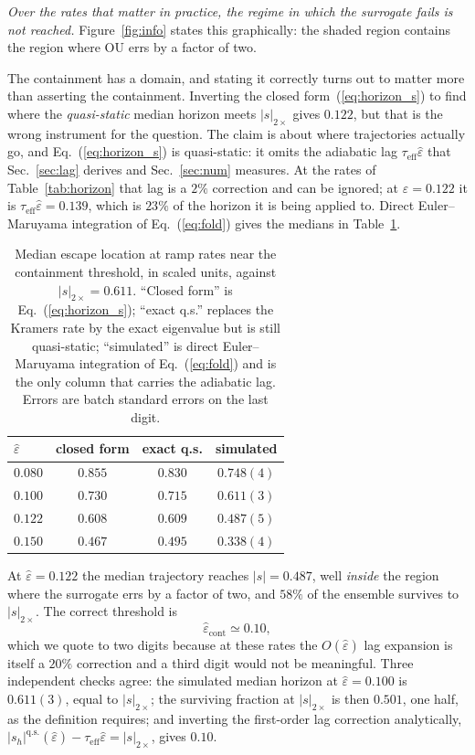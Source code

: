 \documentclass[%
 twocolumn,
 superscriptaddress,
 amsmath,amssymb,
 aps,
 pre,
 floatfix,
]{revtex4-2}
\newcommand{\Sig}{\hat\varepsilon}
\begin{document}
\emph{Over the rates that matter in practice, the regime in which the surrogate fails is not reached.}  Figure~\ref{fig:info} states this graphically: the shaded region contains the region where OU errs by a factor of two.

The containment has a domain, and stating it correctly turns out to matter more than asserting the containment.  Inverting the closed form~(\ref{eq:horizon_s}) to find where the \emph{quasi-static} median horizon meets $|s|_{2\times}$ gives $0.122$, but that is the wrong instrument for the question.  The claim is about where trajectories actually go, and Eq.~(\ref{eq:horizon_s}) is quasi-static: it omits the adiabatic lag $\tau_{\mathrm{eff}}\Sig$ that Sec.~\ref{sec:lag} derives and Sec.~\ref{sec:num} measures.  At the rates of Table~\ref{tab:horizon} that lag is a $2\%$ correction and can be ignored; at $\Sig=0.122$ it is $\tau_{\mathrm{eff}}\Sig=0.139$, which is $23\%$ of the horizon it is being applied to.  Direct Euler--Maruyama integration of Eq.~(\ref{eq:fold}) gives the medians in Table~\ref{tab:containment}.
\begin{table}[b]
\caption{\label{tab:containment}%
Median escape location at ramp rates near the containment threshold, in scaled units, against $|s|_{2\times}=0.611$.  ``Closed form'' is Eq.~(\ref{eq:horizon_s}); ``exact q.s.'' replaces the Kramers rate by the exact eigenvalue but is still quasi-static; ``simulated'' is direct Euler--Maruyama integration of Eq.~(\ref{eq:fold}) and is the only column that carries the adiabatic lag.  Errors are batch standard errors on the last digit.}
\begin{ruledtabular}
\begin{tabular}{lccc}
\hline
$\Sig$ & closed form & exact q.s. & simulated \\
\hline
$0.080$ & $0.855$ & $0.830$ & $0.748(4)$ \\
$0.100$ & $0.730$ & $0.715$ & $0.611(3)$ \\
$0.122$ & $0.608$ & $0.609$ & $0.487(5)$ \\
$0.150$ & $0.467$ & $0.495$ & $0.338(4)$ \\
\end{tabular}
\end{ruledtabular}
\end{table}
At $\Sig=0.122$ the median trajectory reaches $|s|=0.487$, well \emph{inside} the region where the surrogate errs by a factor of two, and $58\%$ of the ensemble survives to $|s|_{2\times}$.  The correct threshold is
\begin{equation}
\label{eq:sigcont}
\Sig_{\mathrm{cont}}\simeq0.10 ,
\end{equation}
which we quote to two digits because at these rates the $O(\Sig)$ lag expansion is itself a $20\%$ correction and a third digit would not be meaningful.  Three independent checks agree: the simulated median horizon at $\Sig=0.100$ is $0.611(3)$, equal to $|s|_{2\times}$; the surviving fraction at $|s|_{2\times}$ is then $0.501$, one half, as the definition requires; and inverting the first-order lag correction analytically, $|s_h|^{\mathrm{q.s.}}(\Sig)-\tau_{\mathrm{eff}}\Sig=|s|_{2\times}$, gives $0.10$.
\end{document}
